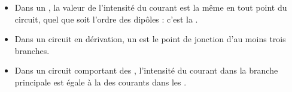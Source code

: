 \documentclass[12pt,a4paper]{article}
\begin{document}
\begin{mybilan}
	\begin{itemize}
		\item Dans un , la valeur de l'intensité du courant est la même en tout point du circuit, quel que soit l'ordre des dipôles : c'est la .
			
			
		
		\item Dans un circuit en dérivation, un  est le point de jonction d'au moins trois branches.
		
		\item Dans un circuit comportant des , l'intensité du courant dans la branche principale est égale à la  des courants dans les .
		
		
		
\end{itemize}
\end{mybilan}
\end{document}
